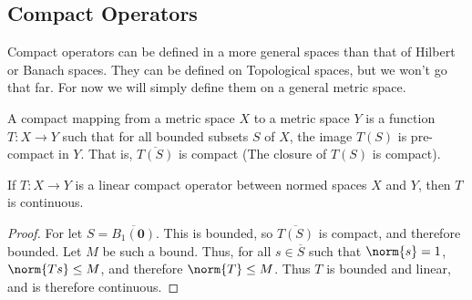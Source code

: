         \subsection{Compact Operators}
            Compact operators can be defined in a more
            general spaces
            than that of Hilbert or Banach spaces.
            They can be defined
            on Topological spaces, but we won't go that far.
            For now we will simply define them on a
            general metric space.
            \begin{definition}
                A compact mapping from a metric space $X$
                to a metric
                space $Y$ is a function $T:X\rightarrow{Y}$
                such that
                for all bounded subsets $S$ of $X$, the image
                $T(S)$ is pre-compact in $Y$. That is,
                $\overline{T(S)}$ is compact
                (The closure of $T(S)$ is compact).
            \end{definition}
            \begin{theorem}
                If $T:X\rightarrow{Y}$ is a linear compact
                operator between normed spaces $X$ and $Y$,
                then $T$ is continuous.
            \end{theorem}
            \begin{proof}
                For let $S=\overline{B_{1}(\mathbf{0})}$.
                This is bounded, so
                $\overline{T(S)}$ is compact, and therefore bounded.
                Let $M$ be such a bound.
                Thus, for all $s\in\overline{S}$
                such that $\norm{s}=1$,
                $\norm{Ts}\leq{M}$, and therefore $\norm{T}\leq{M}$.
                Thus $T$ is bounded and linear, and is therefore
                continuous.
            \end{proof}
